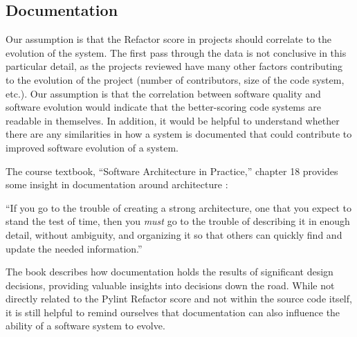 \subsection{Documentation} \label{sectionDocumentation}


Our assumption is that the Refactor score in projects should correlate to the evolution of the system. The first pass through the data is not conclusive in this particular detail, as the projects reviewed have many other factors contributing to the evolution of the project (number of contributors, size of the code system, etc.). Our assumption is that the correlation between software quality and software evolution would indicate that the better-scoring code systems are readable in themselves. In addition, it would be helpful to understand whether there are any similarities in how a system is documented that could contribute to improved software evolution of a system.




The course textbook, ``Software Architecture in Practice,'' chapter 18 provides some insight in documentation around architecture \cite{book:software-architecture-in-practice}:

\vspace{0.25cm}
\begin{displayquote}
``If you go to the trouble of creating a strong architecture, one that you expect to stand the test of time, then you \textit{must} go to the trouble of describing it in enough detail, without ambiguity, and organizing it so that others can quickly find and update the needed information.''
\end{displayquote}
\vspace{0.25cm}

The book describes how documentation holds the results of significant design decisions, providing valuable insights into decisions down the road. While not directly related to the Pylint Refactor score and not within the source code itself, it is still helpful to remind ourselves that documentation can also influence the ability of a software system to evolve.

